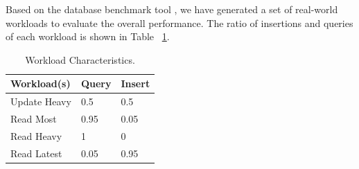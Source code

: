 Based on the database benchmark tool \cite{cooper2010benchmarking}, we have generated a set of real-world workloads to evaluate the overall performance. The ratio of insertions and queries of each workload is shown in Table ~\ref{table:workload}.
\begin{table}
	\begin{center}
		\caption{Workload  Characteristics.}
		\begin{tabular}{|p{2.5cm}|p{1.5cm}|p{1.5cm}|} 
			\hline
			Workload(s) & Query & Insert \\ 
			\hline
			Update Heavy & 0.5 & 0.5 \\ 
			\hline
			Read Most & 0.95 & 0.05 \\
			\hline
			Read Heavy & 1 & 0 \\
			\hline
			Read Latest & 0.05 & 0.95  \\ 
			\hline
		\end{tabular}
		\label{table:workload}
	\end{center}
\end{table}

